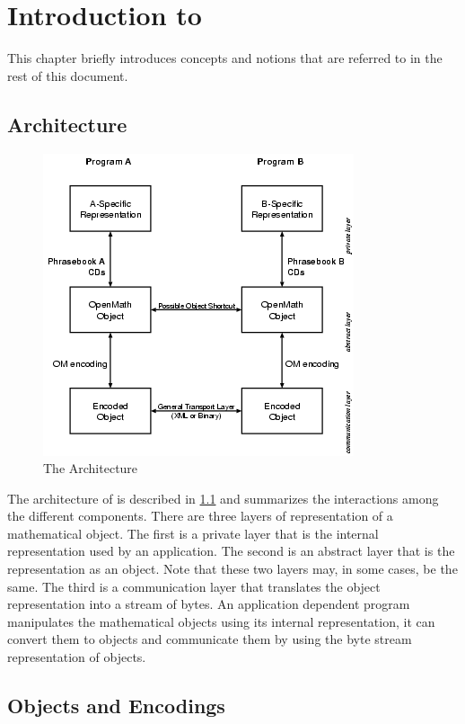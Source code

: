 \chapter{Introduction to \OM}\label{cha_int}

This chapter briefly introduces \OM concepts and notions that are referred to in the rest
of this document.

\section{\OM Architecture}\label{sec_om-arch}


\begin{figure}\centering
  \includegraphics{om-arch}
  \caption{The \OM Architecture}\label{fig_om}
\end{figure}

The architecture of \OM is described in \ref{fig_om} and summarizes the interactions among
the different \OM components.  There are three layers of representation of a mathematical
object. The first is a private layer that is the internal representation used by an
application.  The second is an abstract layer that is the representation as an \OM object.
Note that these two layers may, in some cases, be the same.  The third is a communication
layer that translates the \OM object representation into a stream of bytes. An application
dependent program manipulates the mathematical objects using its internal representation,
it can convert them to \OM objects and communicate them by using the byte stream
representation of \OM objects.


\section{\OM Objects and Encodings}\label{sec_intro-obj}


